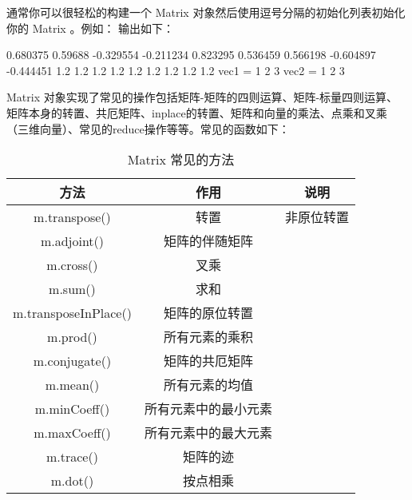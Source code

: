 通常你可以很轻松的构建一个 Matrix 对象然后使用逗号分隔的初始化列表初始化你的 Matrix 。例如：
输出如下：
\begin{bash}
 0.680375   0.59688 -0.329554
-0.211234  0.823295  0.536459
 0.566198 -0.604897 -0.444451
1.2 1.2 1.2
1.2 1.2 1.2
1.2 1.2 1.2
vec1 =
1
2
3
vec2 =
1
2
3
\end{bash}
Matrix 对象实现了常见的操作包括矩阵-矩阵的四则运算、矩阵-标量四则运算、矩阵本身的转置、共厄矩阵、inplace的转置、矩阵和向量的乘法、点乘和叉乘（三维向量）、常见的reduce操作等等。常见的函数如下：
\begin{table}[!htbp]
	\centering
	\caption{Matrix 常见的方法}
	\begin{tabular}{ccc}
		\toprule
		方法&作用&说明\\
		\midrule
		m.transpose()&转置&非原位转置\\
		m.adjoint()&矩阵的伴随矩阵&\\
		m.cross()&叉乘&\\
		m.sum()&求和&\\
		m.transposeInPlace()&矩阵的原位转置\\
		m.prod()&所有元素的乘积&\\
		m.conjugate()&矩阵的共厄矩阵&\\
		m.mean()&所有元素的均值&\\
		m.minCoeff()&所有元素中的最小元素&\\
		m.maxCoeff()&所有元素中的最大元素&\\
		m.trace()&矩阵的迹&\\
		m.dot()&按点相乘&\\
		\bottomrule
	\end{tabular}
	\label{tab:matrix_func}
\end{table}
